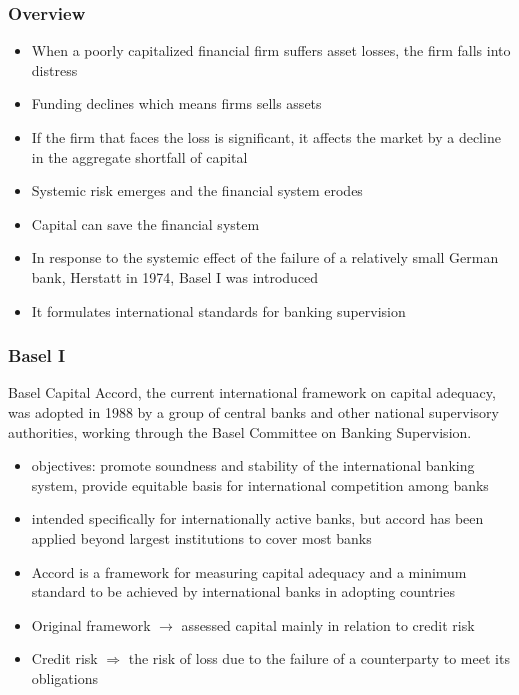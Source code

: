 \documentclass[11pt]{beamer}
\begin{document}
\begin{frame}
\begin{center}
\end{center}
\end{frame}

\begin{frame}
\frametitle{Overview}
\begin{itemize}
\item When a poorly capitalized financial firm suffers asset losses, the firm falls into distress
\item Funding declines which means firms sells assets
\item If the firm that faces the loss is significant, it affects the market by a decline in the aggregate shortfall of capital
\item Systemic risk emerges and the financial system erodes
\item Capital can save the financial system
\item In response to the systemic effect of the failure of a relatively small German bank, Herstatt in 1974, Basel I was introduced
\item It formulates international standards for banking supervision
\end{itemize}
\end{frame}

\begin{frame}
\frametitle{Basel I}
Basel Capital Accord, the current international framework on capital adequacy, was adopted in 1988 by a group of central banks and other national supervisory authorities, working through the Basel Committee on Banking Supervision.
\begin{itemize}
\item objectives: promote soundness and  stability of the international banking system, provide equitable basis for international competition among banks
\item intended specifically for internationally active banks, but accord has been applied beyond largest institutions to cover most banks
\item Accord is a framework for measuring capital adequacy and a minimum standard to be achieved by international banks in adopting countries
\item Original framework $\rightarrow$ assessed capital mainly in relation to credit risk
\item Credit risk $\Rightarrow$ the risk of loss due to the failure of a counterparty to meet its obligations
\end{itemize}
\end{frame}
\end{document}
